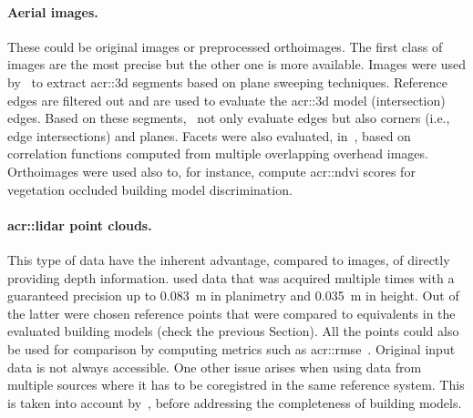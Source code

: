             \paragraph{Aerial images.}
                These could be original images or preprocessed orthoimages.
                The first class of images are the most precise but the other one is more available.
                Images were used by~\textcite{michelin2013quality} to extract \gls{acr::3d} segments based on plane sweeping techniques.
                Reference edges are filtered out and are used to evaluate the \gls{acr::3d} model (intersection) edges.
                Based on these segments,~\textcite{boudet2006supervised} not only evaluate edges but also corners (i.e., edge intersections) and planes.
                Facets were also evaluated, in~\parencite{boudet2006supervised}, based on correlation functions computed from multiple overlapping overhead images.
                Orthoimages were used also to, for instance, compute \gls{acr::ndvi} scores for vegetation occluded building model discrimination.

            \paragraph{\gls{acr::lidar} point clouds.}
                This type of data have the inherent advantage, compared to images, of directly providing depth information.
                \textcite{kaartinen2005accuracy} used data that was acquired multiple times with a guaranteed precision up to \SI{0.083}{\m} in planimetry and \SI{0.035}{\m} in height.
                Out of the latter were chosen reference points that were compared to equivalents in the evaluated building models (check the previous Section).
                All the points could also be used for comparison by computing metrics such as \gls{acr::rmse}~\parencite{lafarge2012creating,zhu2018large}.
                Original input data is not always accessible.
                One other issue arises when using data from multiple sources where it has to be coregistred in the same reference system.
                This is taken into account by~\textcite{akca2010quality}, before addressing the completeness of building models.
            
